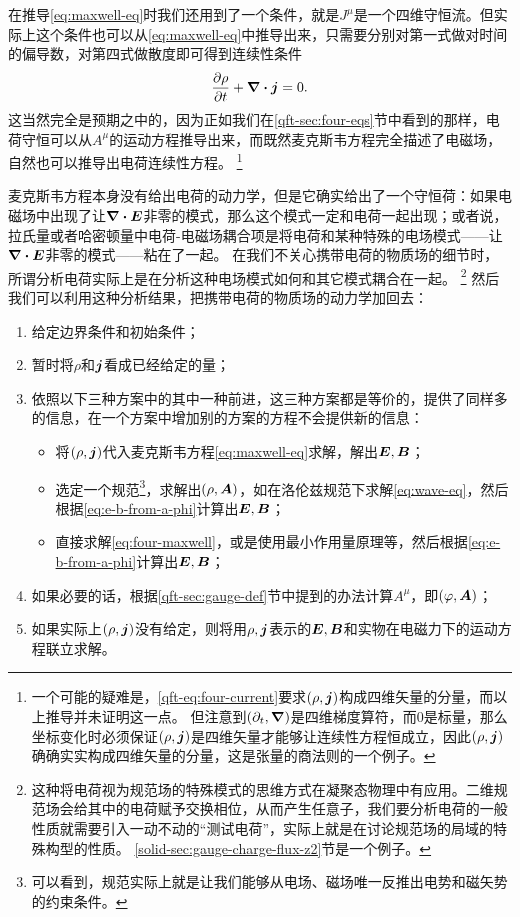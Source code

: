 在推导\eqref{eq:maxwell-eq}时我们还用到了一个条件，就是$J^\mu$是一个四维守恒流。但实际上这个条件也可以从\eqref{eq:maxwell-eq}中推导出来，只需要分别对第一式做对时间的偏导数，对第四式做散度即可得到连续性条件
\begin{equation}
    \pdv{\rho}{t} + \div{\vb*{j}} = 0.
    \label{eq:charge-transportation}
\end{equation}
这当然完全是预期之中的，因为正如我们在\ref{qft-sec:four-eqs}节中看到的那样，电荷守恒可以从$A^\mu$的运动方程推导出来，而既然麦克斯韦方程完全描述了电磁场，自然也可以推导出电荷连续性方程。%
\footnote{一个可能的疑难是，\eqref{qft-eq:four-current}要求$(\rho, \vb*{j})$构成四维矢量的分量，而以上推导并未证明这一点。
但注意到$(\partial_t, \grad)$是四维梯度算符，而$0$是标量，那么坐标变化时必须保证$(\rho, \vb*{j})$是四维矢量才能够让连续性方程恒成立，因此$(\rho, \vb*{j})$确确实实构成四维矢量的分量，这是张量的商法则的一个例子。
}%

麦克斯韦方程本身没有给出电荷的动力学，但是它确实给出了一个守恒荷：如果电磁场中出现了让$\div{\vb*{E}}$非零的模式，那么这个模式一定和电荷一起出现；或者说，拉氏量或者哈密顿量中电荷-电磁场耦合项是将电荷和某种特殊的电场模式——让$\div{\vb*{E}}$非零的模式——粘在了一起。
在我们不关心携带电荷的物质场的细节时，所谓分析电荷实际上是在分析这种电场模式如何和其它模式耦合在一起。%
\footnote{
    这种将电荷视为规范场的特殊模式的思维方式在凝聚态物理中有应用。二维规范场会给其中的电荷赋予交换相位，从而产生任意子，我们要分析电荷的一般性质就需要引入一动不动的“测试电荷”，实际上就是在讨论规范场的局域的特殊构型的性质。
    \ref{solid-sec:gauge-charge-flux-z2}节是一个例子。
}%
然后我们可以利用这种分析结果，把携带电荷的物质场的动力学加回去：
\begin{enumerate}
    \item 给定边界条件和初始条件；
    \item 暂时将$\rho$和$\vb*{j}$看成已经给定的量；
    \item 依照以下三种方案中的其中一种前进，这三种方案都是等价的，提供了同样多的信息，在一个方案中增加别的方案的方程不会提供新的信息：
    \begin{itemize}
        \item 将$(\rho, \vb*{j})$代入麦克斯韦方程\eqref{eq:maxwell-eq}求解，解出$\vb*{E}, \vb*{B}$；
        \item 选定一个规范\footnote{可以看到，规范实际上就是让我们能够从电场、磁场唯一反推出电势和磁矢势的约束条件。}，求解出$(\rho, \vb*{A})$，如在洛伦兹规范下求解\eqref{eq:wave-eq}，然后根据\eqref{eq:e-b-from-a-phi}计算出$\vb*{E}, \vb*{B}$；
        \item 直接求解\eqref{eq:four-maxwell}，或是使用最小作用量原理等，然后根据\eqref{eq:e-b-from-a-phi}计算出$\vb*{E}, \vb*{B}$；
    \end{itemize}
    \item 如果必要的话，根据\ref{qft-sec:gauge-def}节中提到的办法计算$A^\mu$，即$(\varphi, \vb*{A})$；
    \item 如果实际上$(\rho, \vb*{j})$没有给定，则将用$\rho, \vb*{j}$表示的$\vb*{E}, \vb*{B}$和实物在电磁力下的运动方程联立求解。
\end{enumerate}

